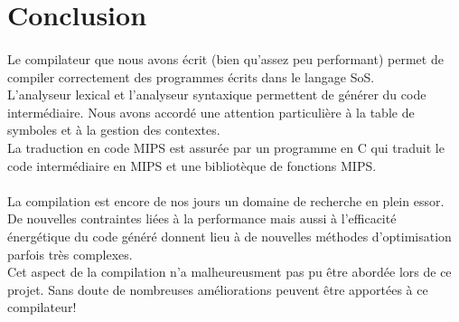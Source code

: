 \section{Conclusion}

\paragraph{}
Le compilateur que nous avons écrit (bien qu'assez peu performant) permet de compiler correctement des programmes écrits dans le langage SoS.\\
L'analyseur lexical et l'analyseur syntaxique permettent de générer du code intermédiaire. Nous avons accordé une attention particulière à la table de symboles et à la gestion des contextes.\\
La traduction en code MIPS est assurée par un programme en C qui traduit le code intermédiaire en MIPS et une bibliotèque de fonctions MIPS.

\paragraph{}
La compilation est encore de nos jours un domaine de recherche en plein essor. De nouvelles contraintes liées à la performance mais aussi à l'efficacité énergétique du code généré donnent lieu à de nouvelles méthodes d'optimisation parfois très complexes.\\
Cet aspect de la compilation n'a malheureusment pas pu être abordée lors de ce projet. Sans doute de nombreuses améliorations peuvent être apportées à ce compilateur!